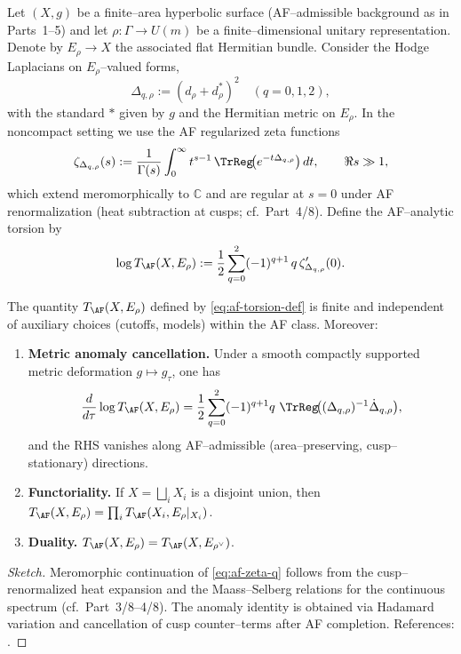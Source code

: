 Let $(X,g)$ be a finite–area hyperbolic surface (AF–admissible background as in Parts~1–5) and let $\rho:\Gamma\to U(m)$ be a finite–dimensional unitary representation. Denote by $E_\rho\to X$ the associated flat Hermitian bundle. Consider the Hodge Laplacians on $E_\rho$–valued forms,
\[
\Delta_{q,\rho} := (d_\rho + d_\rho^\ast)^2 \quad (q=0,1,2),
\]
with the standard $\ast$ given by $g$ and the Hermitian metric on $E_\rho$. In the noncompact setting we use the AF regularized zeta functions
\begin{equation}\label{eq:af-zeta-q}
\zeta_{\Delta_{q,\rho}}(s)
:= \frac{1}{\Gamma(s)}\int_{0}^{\infty} t^{s-1}\,
\TrReg\!\big(e^{-t\Delta_{q,\rho}}\big)\,dt,
\qquad \Re s\gg 1,
\end{equation}
which extend meromorphically to $\mathbb{C}$ and are regular at $s=0$ under AF renormalization (heat subtraction at cusps; cf.\ Part~4/8). Define the AF–analytic torsion by
\begin{equation}\label{eq:af-torsion-def}
\log T_{\AF}(X,E_\rho)
:= \frac12\sum_{q=0}^{2}(-1)^{q+1}\, q\, \zeta'_{\Delta_{q,\rho}}(0).
\end{equation}

\begin{theorem}
\label{thm:af-torsion-existence}
The quantity $T_{\AF}(X,E_\rho)$ defined by \eqref{eq:af-torsion-def} is finite and independent of auxiliary choices (cutoffs, models) within the AF class. Moreover:
\begin{enumerate}[label=\textnormal{(\alph*)},leftmargin=1.2em]
\item \textbf{Metric anomaly cancellation.} Under a smooth compactly supported metric deformation $g\mapsto g_\tau$, one has
\[
\frac{d}{d\tau}\log T_{\AF}(X,E_\rho)
= \frac12\sum_{q=0}^2(-1)^{q+1}q\ \TrReg\!\big((\Delta_{q,\rho})^{-1}\dot{\Delta}_{q,\rho}\big),
\]
and the RHS vanishes along AF–admissible (area–preserving, cusp–stationary) directions. %
\item \textbf{Functoriality.} If $X=\bigsqcup_i X_i$ is a disjoint union, then $T_{\AF}(X,E_\rho)=\prod_i T_{\AF}(X_i,E_\rho|_{X_i})$. %
\item \textbf{Duality.} $T_{\AF}(X,E_\rho)=T_{\AF}(X,E_{\rho^\vee})$. %
\end{enumerate}
\end{theorem}

\begin{proof}[Sketch]
Meromorphic continuation of \eqref{eq:af-zeta-q} follows from the cusp–renormalized heat expansion and the Maass–Selberg relations for the continuous spectrum (cf.\ Part~3/8–4/8). The anomaly identity is obtained via Hadamard variation and cancellation of cusp counter–terms after AF completion. References: \cite{Muller1992,Borthwick,HejhalII}. %
\end{proof}

